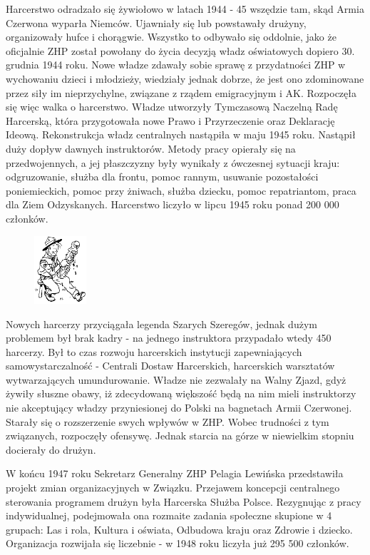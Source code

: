 Harcerstwo odradzało się żywiołowo w latach 1944 - 45 wszędzie tam, skąd Armia Czerwona wyparła Niemców. Ujawniały się lub powstawały drużyny, organizowały hufce i chorągwie. Wszystko to odbywało się oddolnie, jako że oficjalnie ZHP został powołany do życia decyzją władz oświatowych dopiero 30. grudnia 1944 roku. Nowe władze zdawały sobie sprawę z przydatności ZHP w wychowaniu dzieci i młodzieży, wiedziały jednak dobrze, że jest ono zdominowane przez siły im nieprzychylne, związane z rządem emigracyjnym i AK. Rozpoczęła się więc walka o harcerstwo. Władze utworzyły Tymczasową Naczelną Radę Harcerską, która przygotowała nowe Prawo i Przyrzeczenie oraz Deklarację Ideową. Rekonstrukcja władz centralnych nastąpiła w maju 1945 roku. Nastąpił duży dopływ dawnych instruktorów. Metody pracy opierały się na przedwojennych, a jej płaszczyzny były wynikały z ówczesnej sytuacji kraju: odgruzowanie, służba dla frontu, pomoc rannym, usuwanie pozostałości poniemieckich, pomoc przy żniwach, służba dziecku, pomoc repatriantom, praca dla Ziem Odzyskanych. Harcerstwo liczyło w lipcu 1945 roku ponad 200 000 członków. \begin{figure}
  \begin{center}
    \includegraphics[width=1.94cm]{grafiki/str.png}
  \end{center}
\end{figure}
Nowych harcerzy przyciągała legenda Szarych Szeregów, jednak dużym problemem był brak kadry - na jednego instruktora przypadało wtedy 450 harcerzy. Był to czas rozwoju harcerskich instytucji zapewniających samowystarczalność - Centrali Dostaw Harcerskich, harcerskich warsztatów wytwarzających umundurowanie. Władze nie zezwalały na Walny Zjazd, gdyż żywiły słuszne obawy, iż zdecydowaną większość będą na nim mieli instruktorzy nie akceptujący władzy przyniesionej do Polski na bagnetach Armii Czerwonej. Starały się o rozszerzenie swych wpływów w ZHP. Wobec trudności z tym związanych, rozpoczęły ofensywę. Jednak starcia na górze w niewielkim stopniu docierały do drużyn.

W końcu 1947 roku Sekretarz Generalny ZHP Pelagia Lewińska przedstawiła projekt zmian organizacyjnych w Związku. Przejawem koncepcji centralnego sterowania programem drużyn była Harcerska Służba Polsce. 
Rezygnując z pracy indywidualnej, podejmowała ona rozmaite zadania społeczne skupione w 4 grupach: Las i rola, Kultura i oświata, Odbudowa kraju oraz Zdrowie i dziecko.
Organizacja rozwijała się liczebnie - w 1948 roku liczyła już 295 500 członków.

